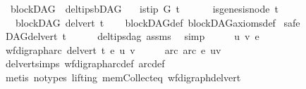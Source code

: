 \begin{isabellebody}
\endisatagproof
{\isafoldproof}%
%
\isadelimproof
\isanewline
%
\endisadelimproof
\isanewline
{}\isamarkupfalse%
\ {\isacharparenleft}{\kern0pt}\ blockDAG{\isacharparenright}{\kern0pt}\ \ del{\isacharunderscore}{\kern0pt}tips{\isacharunderscore}{\kern0pt}bDAG{\isacharcolon}{\kern0pt}\isanewline
\ \ \ {\isachardoublequoteopen}is{\isacharunderscore}{\kern0pt}tip\ G\ t{\isachardoublequoteclose}\isanewline
\ \ \ \ \ {\isachardoublequoteopen}\ {\isasymnot}is{\isacharunderscore}{\kern0pt}genesis{\isacharunderscore}{\kern0pt}node\ t{\isachardoublequoteclose}\isanewline
\ \ \ {\isachardoublequoteopen}blockDAG\ {\isacharparenleft}{\kern0pt}del{\isacharunderscore}{\kern0pt}vert\ t{\isacharparenright}{\kern0pt}{\isachardoublequoteclose}\isanewline
%
\isadelimproof
\ \ %
\endisadelimproof
%
\isatagproof
{}\isamarkupfalse%
\ blockDAG{\isacharunderscore}{\kern0pt}def\ blockDAG{\isacharunderscore}{\kern0pt}axioms{\isacharunderscore}{\kern0pt}def\isanewline
{}\isamarkupfalse%
\ safe\isanewline
\ \ \isamarkupfalse%
\ {\isachardoublequoteopen}DAG{\isacharparenleft}{\kern0pt}del{\isacharunderscore}{\kern0pt}vert\ t{\isacharparenright}{\kern0pt}{\isachardoublequoteclose}\isanewline
\ \ \ \ \isamarkupfalse%
\ del{\isacharunderscore}{\kern0pt}tips{\isacharunderscore}{\kern0pt}dag\ assms\ \isamarkupfalse%
\ simp\isanewline
{}\isamarkupfalse%
\ \isanewline
\ \ \isamarkupfalse%
\ u\ v\ e\ \isanewline
\ \ \isamarkupfalse%
\ {\isachardoublequoteopen}wf{\isacharunderscore}{\kern0pt}digraph{\isachardot}{\kern0pt}arc\ {\isacharparenleft}{\kern0pt}del{\isacharunderscore}{\kern0pt}vert\ t{\isacharparenright}{\kern0pt}\ e\ {\isacharparenleft}{\kern0pt}u{\isacharcomma}{\kern0pt}\ v{\isacharparenright}{\kern0pt}{\isachardoublequoteclose}\isanewline
\ \ \isamarkupfalse%
\ \isamarkupfalse%
\ arc{\isacharcolon}{\kern0pt}\ {\isachardoublequoteopen}arc\ e\ {\isacharparenleft}{\kern0pt}u{\isacharcomma}{\kern0pt}v{\isacharparenright}{\kern0pt}{\isachardoublequoteclose}\ \isamarkupfalse%
\ del{\isacharunderscore}{\kern0pt}vert{\isacharunderscore}{\kern0pt}simps\ wf{\isacharunderscore}{\kern0pt}digraph{\isachardot}{\kern0pt}arc{\isacharunderscore}{\kern0pt}def\ arc{\isacharunderscore}{\kern0pt}def\isanewline
\ \ \ \ \isamarkupfalse%
\ {\isacharparenleft}{\kern0pt}metis\ {\isacharparenleft}{\kern0pt}no{\isacharunderscore}{\kern0pt}types{\isacharcomma}{\kern0pt}\ lifting{\isacharparenright}{\kern0pt}\ mem{\isacharunderscore}{\kern0pt}Collect{\isacharunderscore}{\kern0pt}eq\ wf{\isacharunderscore}{\kern0pt}digraph{\isacharunderscore}{\kern0pt}del{\isacharunderscore}{\kern0pt}vert{\isacharparenright}{\kern0pt}\isanewline

\end{isabellebody}

